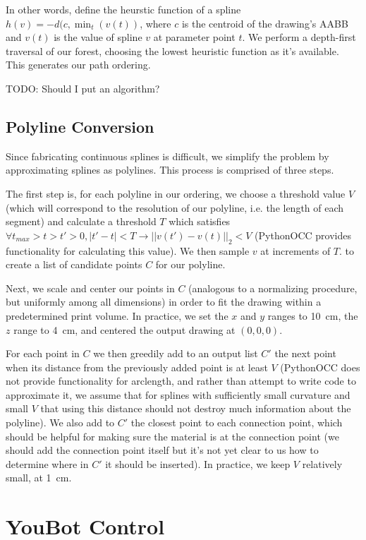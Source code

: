 \documentclass[conference]{acmsiggraph}
\begin{document}
In other words, define the heurstic function of a spline $h(v) = -d(c, \min_t(v(t))$, where $c$ is the centroid of the drawing's AABB and $v(t)$ is the value of spline $v$ at parameter point $t$.  We perform a depth-first traversal of our forest, choosing the lowest heuristic function as it's available.  This generates our path ordering.

TODO: Should I put an algorithm?


\subsection{Polyline Conversion}
Since fabricating continuous splines is difficult, we simplify the problem by approximating splines as polylines.  This process is comprised of three steps.

The first step is, for each polyline in our ordering, we choose a threshold value $V$ (which will correspond to the resolution of our polyline, i.e. the length of each segment) and calculate a threshold $T$ which satisfies $\forall t_{max} > t > t' > 0, |t' - t| < T \rightarrow ||v(t') - v(t)||_2 < V$ (PythonOCC provides functionality for calculating this value).  We then sample $v$ at increments of $T$. to create a list of candidate points $C$ for our polyline.  

Next, we scale and center our points in $C$ (analogous to a normalizing procedure, but uniformly among all dimensions) in order to fit the drawing within a predetermined print volume.  In practice, we set the $x$ and $y$ ranges to 10~cm, the $z$ range to 4~cm, and centered the output drawing at $(0, 0, 0)$.

For each point in $C$ we then greedily add to an output list $C'$ the next point when its distance from the previously added point is at least $V$ (PythonOCC does not provide functionality for arclength, and rather than attempt to write code to approximate it, we assume that for splines with sufficiently small curvature and small $V$ that using this distance should not destroy much information about the polyline).  We also add to $C'$ the closest point to each connection point, which should be helpful for making sure the material is at the connection point (we should add the connection point itself but it's not yet clear to us how to determine where in $C'$ it should be inserted).  In practice, we keep $V$ relatively small, at 1~cm.

\section{YouBot Control}
\end{document}
